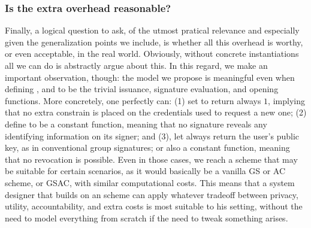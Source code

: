 \subsubsection{Is the extra overhead reasonable?} %
Finally, a logical question to ask, of the utmost pratical relevance and
especially given the generalization points we include, is whether all this
overhead is worthy, or even acceptable, in the real world. Obviously, without
concrete instantiations all we can do is abstractly argue about this. In this
regard, we make an important observation, though: the \UAS model we propose is
meaningful even when defining \fissue, \feval and \finsp to be the trivial
issuance, signature evaluation, and opening functions. More concretely, one
perfectly can: (1) set \fissue to return always $1$, implying that no extra
constrain is placed on the credentials used to request a new one; (2) define
\feval to be a constant function, meaning that no signature reveals any
identifying information on its signer; and (3), let \finsp always return the
user's public key, as in conventional group signatures; or also a constant
function, meaning that no revocation is possible. Even in those cases, we reach
a scheme that may be suitable for certain scenarios, as it would basically be
a vanilla GS or AC scheme, or GSAC, with similar computational costs.
This means that a system designer that builds on an \UAS scheme can apply
whatever tradeoff between privacy, utility, accountability, and extra costs
is most suitable to his setting, without the need to model everything from
scratch if the need to tweak something arises.


